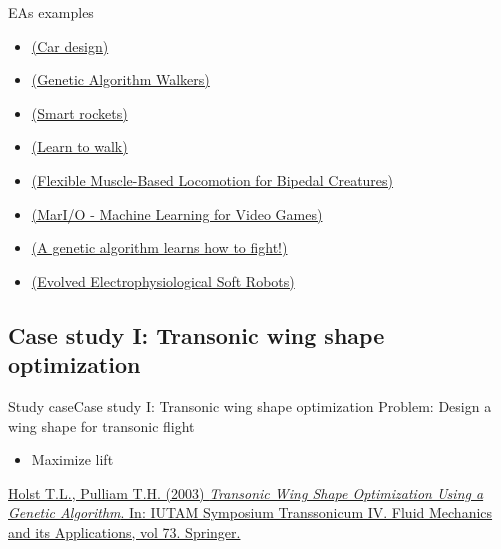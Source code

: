 \documentclass[10pt,compress]{beamer} %
\begin{document}
\begin{frame}{EAs examples}
	\begin{itemize}
		\item \href{http://rednuht.org/genetic\_cars\_2/} {(Car design)}
		\item \href{http://rednuht.org/genetic\_walkers/} {(Genetic Algorithm Walkers)}
		\item \href{http://www.blprnt.com/smartrockets/}{(Smart rockets)}
		\item \href{https://www.youtube.com/watch?v=xcIBoPuNIiw}{(Learn to walk)}
		\item \href{https://www.youtube.com/watch?v=pgaEE27nsQw}{(Flexible Muscle-Based Locomotion for Bipedal Creatures)}
		\item \href{https://www.youtube.com/watch?v=qv6UVOQ0F44}{(MarI/O - Machine Learning for Video Games)}
		\item \href{https://www.youtube.com/watch?v=u2t77mQmJiY}{(A genetic algorithm learns how to fight!)}
		\item \href{https://www.youtube.com/watch?v=HgWQ-gPIvt4}{(Evolved Electrophysiological Soft Robots)}
	\end{itemize}
\end{frame}

\subsection{Case study I: Transonic wing shape optimization}
\begin{frame}{Study case}{Case study I: Transonic wing shape optimization}
    Problem: Design a wing shape for transonic flight
        \begin{itemize}
        \item Maximize lift
        \end{itemize}

    \setlength{\fboxrule}{0pt}
    \centering {} 
    
    \small
    \begin{flushleft}
    \href{https://link.springer.com/chapter/10.1007/978-94-010-0017-8\_38\#citeas}{Holst T.L., Pulliam T.H. (2003) \textit{Transonic Wing Shape Optimization Using a Genetic Algorithm}. In: IUTAM Symposium Transsonicum IV. Fluid Mechanics and its Applications, vol 73. Springer.}
    \end{flushleft}
\end{frame}
\end{document}
